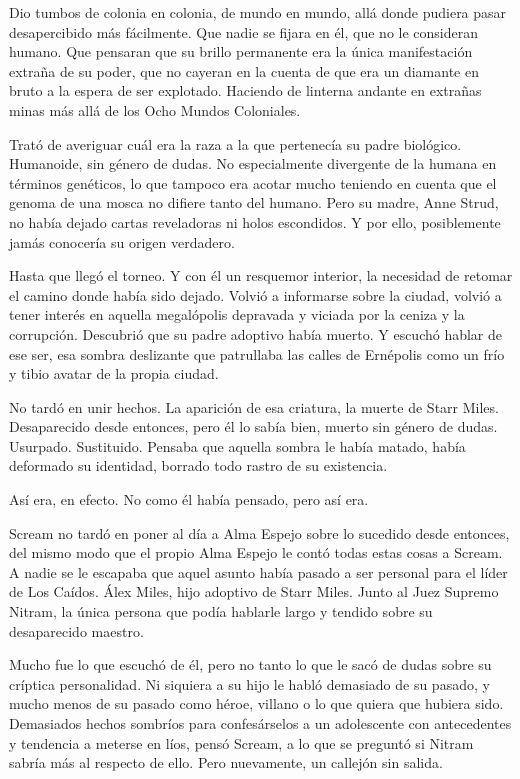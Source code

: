 Dio tumbos de colonia en colonia, de mundo en mundo, allá donde pudiera pasar desapercibido más fácilmente. Que nadie se fijara en él, que no le consideran humano. Que pensaran que su brillo permanente era la única manifestación extraña de su poder, que no cayeran en la cuenta de que era un diamante en bruto a la espera de ser explotado. Haciendo de linterna andante en extrañas minas más allá de los Ocho Mundos Coloniales.

Trató de averiguar cuál era la raza a la que pertenecía su padre biológico. Humanoide, sin género de dudas. No especialmente divergente de la humana en términos genéticos, lo que tampoco era acotar mucho teniendo en cuenta que el genoma de una mosca no difiere tanto del humano. Pero su madre, Anne Strud, no había dejado cartas reveladoras ni holos escondidos. Y por ello, posiblemente jamás conocería su origen verdadero.

Hasta que llegó el torneo. Y con él un resquemor interior, la necesidad de retomar el camino donde había sido dejado. Volvió a informarse sobre la ciudad, volvió a tener interés en aquella megalópolis depravada y viciada por la ceniza y la corrupción. Descubrió que su padre adoptivo había muerto. Y escuchó hablar de ese ser, esa sombra deslizante que patrullaba las calles de Ernépolis como un frío y tibio avatar de la propia ciudad.

No tardó en unir hechos. La aparición de esa criatura, la muerte de Starr Miles. Desaparecido desde entonces, pero él lo sabía bien, muerto sin género de dudas. Usurpado. Sustituido. Pensaba que aquella sombra le había matado, había deformado su identidad, borrado todo rastro de su existencia.

Así era, en efecto. No como él había pensado, pero así era.

Scream no tardó en poner al día a Alma Espejo sobre lo sucedido desde entonces, del mismo modo que el propio Alma Espejo le contó todas estas cosas a Scream. A nadie se le escapaba que aquel asunto había pasado a ser personal para el líder de Los Caídos. Álex Miles, hijo adoptivo de Starr Miles. Junto al Juez Supremo Nitram, la única persona que podía hablarle largo y tendido sobre su desaparecido maestro.

Mucho fue lo que escuchó de él, pero no tanto lo que le sacó de dudas sobre su críptica personalidad. Ni siquiera a su hijo le habló demasiado de su pasado, y mucho menos de su pasado como héroe, villano o lo que quiera que hubiera sido. Demasiados hechos sombríos para confesárselos a un adolescente con antecedentes y tendencia a meterse en líos, pensó Scream, a lo que se preguntó si Nitram sabría más al respecto de ello. Pero nuevamente, un callejón sin salida.

